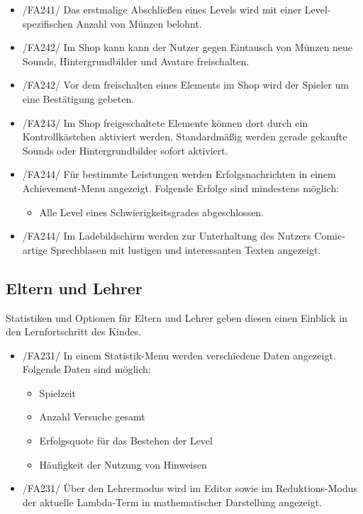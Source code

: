 \begin{itemize}
\item /FA241/ Das erstmalige Abschließen eines Levels wird mit einer Level-spezifischen Anzahl von Münzen belohnt.
\item /FA242/ Im Shop kann kann der Nutzer gegen Eintausch von Münzen neue Sounds, Hintergrundbilder und Avatare freischalten.
\item /FA242/ Vor dem freischalten eines Elements im Shop wird der Spieler um eine Bestätigung gebeten.
\item /FA243/ Im Shop freigeschaltete Elemente können dort durch ein Kontrollkästchen aktiviert werden. Standardmäßig werden gerade gekaufte Sounds oder Hintergrundbilder sofort aktiviert.
\item /FA244/ Für bestimmte Leistungen werden Erfolgsnachrichten in einem Achievement-Menu angezeigt. Folgende Erfolge sind mindestens möglich:
\begin{itemize}
\item Alle Level eines Schwierigkeitsgrades abgeschlossen.
\end{itemize}
\item /FA244/ Im Ladebildschirm werden zur Unterhaltung des Nutzers Comic-artige Sprechblasen mit lustigen und interessanten Texten angezeigt.
\end{itemize}

\subsection{Eltern und Lehrer}

Statistiken und Optionen für Eltern und Lehrer geben diesen einen Einblick in den Lernfortschritt des Kindes.

\begin{itemize}
\item /FA231/ In einem Statistik-Menu werden verschiedene Daten angezeigt. Folgende Daten sind möglich:
\begin{itemize}
\item Spielzeit
\item Anzahl Versuche gesamt
\item Erfolgsquote für das Bestehen der Level
\item Häufigkeit der Nutzung von Hinweisen
\end{itemize}
\item /FA231/ Über den Lehrermodus wird im Editor sowie im Reduktions-Modus der aktuelle Lambda-Term in mathematischer Darstellung angezeigt.
\end{itemize}


